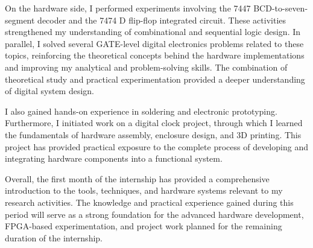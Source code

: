 \documentclass[12pt, a4paper]{article}
\begin{document}
On the hardware side, I performed experiments involving the 7447 BCD-to-seven-segment decoder and the 7474 D flip-flop integrated circuit. These activities strengthened my understanding of combinational and sequential logic design. In parallel, I solved several GATE-level digital electronics problems related to these topics, reinforcing the theoretical concepts behind the hardware implementations and improving my analytical and problem-solving skills. The combination of theoretical study and practical experimentation provided a deeper understanding of digital system design.

I also gained hands-on experience in soldering and electronic prototyping. Furthermore, I initiated work on a digital clock project, through which I learned the fundamentals of hardware assembly, enclosure design, and 3D printing. This project has provided practical exposure to the complete process of developing and integrating hardware components into a functional system.

Overall, the first month of the internship has provided a comprehensive introduction to the tools, techniques, and hardware systems relevant to my research activities. The knowledge and practical experience gained during this period will serve as a strong foundation for the advanced hardware development, FPGA-based experimentation, and project work planned for the remaining duration of the internship.
\end{document}
